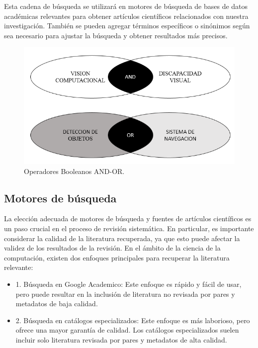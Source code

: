 \documentclass[letterpaper]{article}
\begin{document}
    Esta cadena de búsqueda se utilizará en motores de búsqueda de bases de datos académicas relevantes para obtener artículos científicos relacionados con nuestra investigación. También se pueden agregar términos específicos o sinónimos según sea necesario para ajustar la búsqueda y obtener resultados más precisos.

    \begin{figure}[hbtp]
    		\centering
    		\includegraphics[width=1\columnwidth]{graficos/Operadores-booleanos.png}
    		\caption{Operadores Booleanos AND-OR.}
    		\label{operadores}
    	\end{figure}
	
	\subsection{Motores de búsqueda}
	La elección adecuada de motores de búsqueda y fuentes de artículos científicos es un paso crucial en el proceso de revisión sistemática. En particular, es importante considerar la calidad de la literatura recuperada, ya que esto puede afectar la validez de los resultados de la revisión. En el ámbito de la ciencia de la computación, existen dos enfoques principales para recuperar la literatura relevante:
    \begin{itemize}
        \item 1. Búsqueda en Google Academico: Este enfoque es rápido y fácil de usar, pero puede resultar en la inclusión de literatura no revisada por pares y metadatos de baja calidad.

        \item 2. Búsqueda en catálogos especializados: Este enfoque es más laborioso, pero ofrece una mayor garantía de calidad. Los catálogos especializados suelen incluir solo literatura revisada por pares y metadatos de alta calidad.
    \end{itemize}
\end{document}
